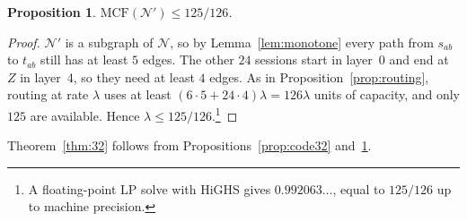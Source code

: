 \documentclass[11pt]{article}
\newtheorem{proposition}[theorem]{Proposition}
\newcommand{\MCF}{\mathrm{MCF}}
\begin{document}
\begin{proposition}\label{prop:routing32}
$\MCF(\mathcal N')\le125/126$.
\end{proposition}

\begin{proof}
$\mathcal N'$ is a subgraph of $\mathcal N$, so by Lemma~\ref{lem:monotone} every path from $s_{ab}$ to $t_{ab}$ still has at least $5$ edges. The other $24$ sessions start in layer~0 and end at $Z$ in layer~4, so they need at least $4$ edges. As in Proposition~\ref{prop:routing}, routing at rate $\lambda$ uses at least $(6\cdot5+24\cdot4)\lambda=126\lambda$ units of capacity, and only $125$ are available. Hence $\lambda\le125/126$.\footnote{A floating-point LP solve with HiGHS gives $0.992063\ldots$, equal to $125/126$ up to machine precision.}
\end{proof}

Theorem~\ref{thm:32} follows from Propositions~\ref{prop:code32} and~\ref{prop:routing32}.
\end{document}
